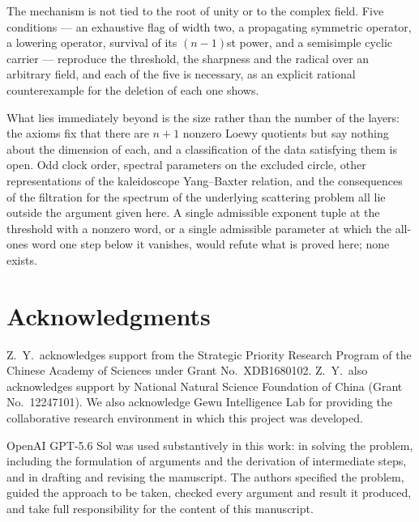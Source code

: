 \documentclass[11pt,reqno]{amsart}
\theoremstyle{plain}
\theoremstyle{definition}
\theoremstyle{remark}
\numberwithin{equation}{section}
\begin{document}
The mechanism is not tied to the root of unity or to the complex field. Five
conditions --- an exhaustive flag of width two, a propagating symmetric
operator, a lowering operator, survival of its $(n-1)$st power, and a
semisimple cyclic carrier --- reproduce the threshold, the sharpness and the
radical over an arbitrary field, and each of the five is necessary, as an
explicit rational counterexample for the deletion of each one shows.

What lies immediately beyond is the size rather than the number of the layers:
the axioms fix that there are $n+1$ nonzero Loewy quotients but say nothing
about the dimension of each, and a classification of the data satisfying them
is open. Odd clock order, spectral parameters on the excluded circle, other
representations of the kaleidoscope Yang--Baxter relation, and the
consequences of the filtration for the spectrum of the underlying scattering
problem all lie outside the argument given here. A single admissible exponent
tuple at the threshold with a nonzero word, or a single admissible parameter at
which the all-ones word one step below it vanishes, would refute what is proved
here; none exists.

\section*{Acknowledgments}

Z.\ Y.\ acknowledges support from the Strategic Priority Research Program of the
Chinese Academy of Sciences under Grant No.~XDB1680102. Z.\ Y.\ also
acknowledges support by National Natural Science Foundation of China (Grant
No.~12247101). We also acknowledge Gewu Intelligence Lab for providing the
collaborative research environment in which this project was developed.

OpenAI GPT-5.6 Sol was used substantively in this work: in solving the
problem, including the formulation of arguments and the derivation of
intermediate steps, and in drafting and revising the manuscript. The authors
specified the problem, guided the approach to be taken, checked every argument
and result it produced, and take full responsibility for the content of this
manuscript.



\end{document}

